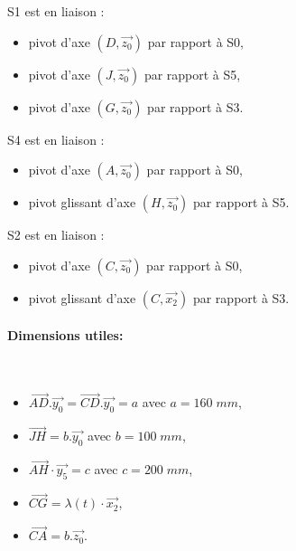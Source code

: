 \begin{minipage}[t]{0.45\linewidth}
S1 est en liaison :
\begin{itemize}
 \item pivot d'axe $(D,\overrightarrow{z_0})$ par rapport à S0,
 \item pivot d'axe $(J,\overrightarrow{z_0})$ par rapport à S5,
 \item pivot d'axe  $(G,\overrightarrow{z_0})$ par rapport à S3.
\end{itemize}

S4 est en liaison :
\begin{itemize}
 \item pivot d'axe  $(A,\overrightarrow{z_0})$ par rapport à S0,
 \item pivot glissant d'axe  $(H,\overrightarrow{z_0})$ par rapport à S5.
\end{itemize}
\end{minipage}\hfill
\begin{minipage}[t]{0.45\linewidth}
S2 est en liaison :
\begin{itemize}
 \item pivot d'axe $(C,\overrightarrow{z_0})$ par rapport à S0,
 \item pivot glissant d'axe $(C,\overrightarrow{x_2})$ par rapport à S3.
\end{itemize}
\end{minipage}

\paragraph{Dimensions utiles:} ~\
\begin{itemize}
 \item $\overrightarrow{AD}.\overrightarrow{y_0}=\overrightarrow{CD}.\overrightarrow{y_0}=a$ avec $a=160\;mm$,
 \item $\overrightarrow{JH}=b.\overrightarrow{y_0}$ avec $b=100\;mm$,
 \item $\overrightarrow{AH}\cdot \overrightarrow{y_5}=c$ avec $c=200\;mm$,
 \item $\overrightarrow{CG}=\lambda(t)\cdot\overrightarrow{x_2}$,
 \item $\overrightarrow{CA}=b.\overrightarrow{z_0}$.
\end{itemize}


